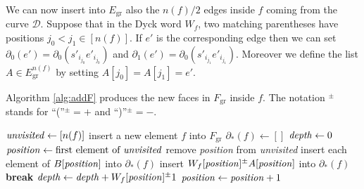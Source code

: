 \documentclass[11pt,reqno]{amsart}
\theoremstyle{plain}
\theoremstyle{definition}
\theoremstyle{remark}
\numberwithin{equation}{subsection}
\newcommand*{\calD}{\mathcal{D}}
\DeclareMathOperator{\gr}{gr}
\begin{document}
We can now insert into $E_{\gr}$ also the $n(f)/2$ edges inside $f$ coming from the curve $\calD$. Suppose that in the Dyck word $W_f$, two matching parentheses have positions $j_0<j_1\in[n(f)]$. If $e'$ is the corresponding edge then we can set $\partial_0(e')=\partial_0(s'_{i_{j_0}}e'_{i_{j_0}})$ and $\partial_1(e')=\partial_0(s'_{i_{j_1}}e'_{i_{j_1}})$. Moreover we define the list $A\in E_{\gr}^{n(f)}$ by setting $A[j_0]=A[j_1]=e'$.

Algorithm \ref{alg:addF} produces the new faces in $F_{\gr}$ inside $f$. The notation $^\pm$ stands for ``(''$^\pm=+$ and ``)''$^\pm=-$.

\begin{algorithm}
\caption{Filling $F_{\gr}$ and the values of $\partial_*\colon F_{\gr}\to(\{+,-\}\times E_{\gr})^{<\infty}$}\label{alg:addF}
\begin{algorithmic}
\State $\text{\textit{unvisited}} \gets [n(f)]$
    \State insert a new element $f$ into $F_{\gr}$
    \State $\partial_*(f) \gets []$
    \State $\text{\textit{depth}} \gets 0$
    \State $\text{\textit{position}} \gets \text{first element of \textit{unvisited}}$
            \State remove \textit{position} from \textit{unvisited}
            \State insert each element of $B[\text{\textit{position}}]$ into $\partial_*(f)$
            \State insert $W_f[\text{\textit{position}}]^\pm A[\text{\textit{position}}]$ into $\partial_*(f)$
                \State \textbf{break} 
            \EndIf
        \EndIf
        \State $\text{\textit{depth}} \gets \text{\textit{depth}} + W_f[\text{\textit{position}}]^\pm1$%
        \State $\text{\textit{position}} \gets \text{\textit{position}} + 1$
    \EndWhile
\EndWhile
\end{algorithmic}
\end{algorithm}
\end{document}
